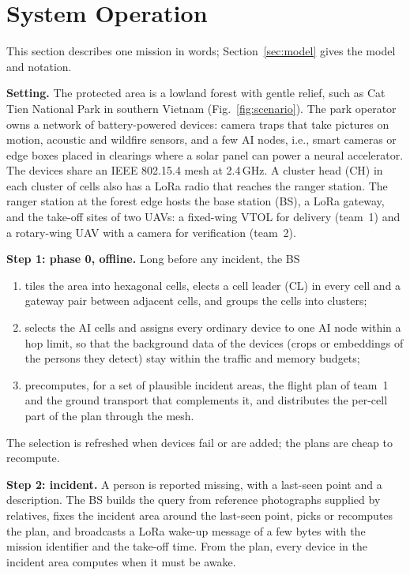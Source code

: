 \section{System Operation}\label{sec:system}
This section describes one mission in words; Section~\ref{sec:model} gives the model and notation.

\textbf{Setting.} The protected area is a lowland forest with gentle relief, such as Cat Tien National Park in southern
Vietnam (Fig.~\ref{fig:scenario}). The park operator owns a network of battery-powered devices: camera traps that take
pictures on motion, acoustic and wildfire sensors, and a few AI nodes, i.e., smart cameras or edge boxes placed in
clearings where a solar panel can power a neural accelerator. The devices share an IEEE 802.15.4 mesh at 2.4\,GHz. A
cluster head (CH) in each cluster of cells also has a LoRa radio that reaches the ranger station. The ranger station at
the forest edge hosts the base station (BS), a LoRa gateway, and the take-off sites of two UAVs: a fixed-wing VTOL for
delivery (team~1) and a rotary-wing UAV with a camera for verification (team~2).

\textbf{Step 1: phase 0, offline.} Long before any incident, the BS
\begin{enumerate}
\item tiles the area into hexagonal cells, elects a cell leader (CL) in every cell and a gateway pair between adjacent
cells, and groups the cells into clusters;
\item selects the AI cells and assigns every ordinary device to one AI node within a hop limit, so that the background
data of the devices (crops or embeddings of the persons they detect) stay within the traffic and memory budgets;
\item precomputes, for a set of plausible incident areas, the flight plan of team~1 and the ground transport that
complements it, and distributes the per-cell part of the plan through the mesh.
\end{enumerate}
The selection is refreshed when devices fail or are added; the plans are cheap to recompute.

\textbf{Step 2: incident.} A person is reported missing, with a last-seen point and a description. The BS builds the
query from reference photographs supplied by relatives, fixes the incident area around the last-seen point, picks or
recomputes the plan, and broadcasts a LoRa wake-up message of a few bytes with the mission identifier and the take-off
time. From the plan, every device in the incident area computes when it must be awake.

